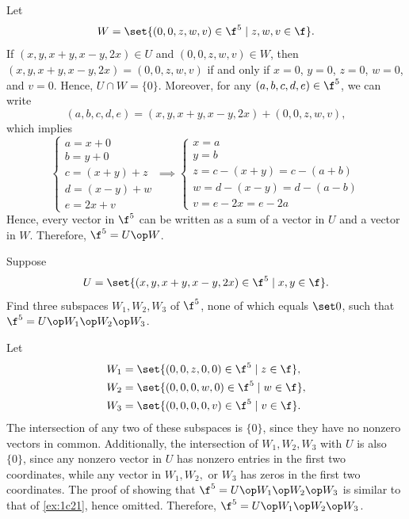 \begin{sol}
    Let
    \[W = \set{(0, 0, z, w, v) \in \f^5 \mid z, w, v \in \f}.\]
    If $(x, y, x + y, x - y, 2x) \in U$ and $(0, 0, z, w, v) \in W$, then $(x, y, x + y, x - y, 2x) = (0, 0, z, w, v)$ if and only if $x = 0$, $y = 0$, $z = 0$, $w = 0$, and $v = 0$. Hence, $U \cap W = \{0\}$. Moreover, for any $(a, b, c, d, e) \in \f^5$, we can write
    \[(a, b, c, d, e) = (x, y, x + y, x - y, 2x) + (0, 0, z, w, v),\]
    which implies
    \[
    \begin{cases}
        a = x + 0 \\
        b = y + 0 \\
        c = (x + y) + z \\
        d = (x - y) + w \\
        e = 2x + v
    \end{cases} \implies 
    \begin{cases}
        x = a \\
        y = b \\
        z = c - (x + y) = c - (a + b) \\
        w = d - (x - y) = d - (a - b) \\
        v = e - 2x = e - 2a
    \end{cases}\]
    Hence, every vector in $\f^5$ can be written as a sum of a vector in $U$ and a vector in $W$. Therefore, $\f^5 = U \op W$.
\end{sol}

\begin{exercise}[1c22]
    Suppose
    \[U = \set{(x, y, x + y, x - y, 2x) \in \f^5 \mid x, y \in \f}.\]
    Find three subspaces $W_1, W_2, W_3$ of $\f^5$, none of which equals $\set 0$, such that $\f^5 = U \op W_1 \op W_2 \op W_3$.
\end{exercise}

\begin{sol}
    Let
    \begin{align*}
        W_1 &= \set{(0, 0, z, 0, 0) \in \f^5 \mid z \in \f}, \\
        W_2 &= \set{(0, 0, 0, w, 0) \in \f^5 \mid w \in \f}, \\
        W_3 &= \set{(0, 0, 0, 0, v) \in \f^5 \mid v \in \f}.
    \end{align*}
    The intersection of any two of these subspaces is $\{0\}$, since they have no nonzero vectors in common. Additionally, the intersection of $W_1, W_2, W_3$ with $U$ is also $\{0\}$, since any nonzero vector in $U$ has nonzero entries in the first two coordinates, while any vector in $W_1, W_2,$ or $W_3$ has zeros in the first two coordinates. The proof of showing that $\f^5 = U \op W_1 \op W_2 \op W_3$ is similar to that of \autoref{ex:1c21}, hence omitted. Therefore, $\f^5 = U \op W_1 \op W_2 \op W_3$.
\end{sol}

